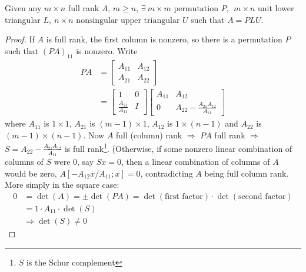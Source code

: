 \documentclass[11pt]{article}
\numberwithin{equation}{section}
\begin{document}
\begin{savenotes}
    \begin{theorem}[LU Decomposition]
        Given any $m \times n$ full rank $A$, $m \geq n$, $\exists \ m \times m \text{ permutation } P, \ \ m \times n $ unit lower triangular $L, \ n \times n \text{ nonsingular upper triangular }U$
        such that $A=PL U$.
        \begin{proof}
            If $A$ is full rank, the first column is nonzero, so there is a permutation $P$ such that $(PA)_{11}$ is nonzero. Write \begin{align*}
                PA &= \left[\begin{array}{ll}
                    A_{11} & A_{12} \\
                    A_{21} & A_{22}
                    \end{array}\right] \\
                &= \left[\begin{array}{ll}
                    1 & 0 \\
                    \frac{A_{21}}{A_{11}} & I
                    \end{array}\right] \left[\begin{array}{ll}
                        A_{11} & A_{12} \\
                        0 & A_{22} - \frac{A_{21} A_{12}}{A_{11}}
                        \end{array}\right]
            \end{align*}
            where $A_{11}$ is $1 \times 1$, $A_{21}$ is $(m-1) \times 1$, $A_{12}$ is $1 \times (n-1)$ and $A_{22}$ is $(m-1) \times (n-1)$.
            Now $A$ full (column) rank $\Longrightarrow$ $PA$ full rank $\Longrightarrow$ $S = A_{22} - \frac{A_{21} A_{12}}{A_{11}}$ is full rank\footnote{$S$ is the Schur complement}. 
            (Otherwise, if some nonzero linear combination of columns of $S$ were 0, say $Sx=0$, then a linear combination of columns of $A$ would be zero, 
            $A\left[ -A_{12} x/A_{11} ; x \right] = 0$, contradicting $A$ being full column rank. More simply in the square case: \begin{align*}
                0 &= \operatorname{det}(A) = \pm \operatorname{det}(PA) = \operatorname{det}(\text{first factor}) \cdot \operatorname{det}(\text{second factor}) \\
                &= 1 \cdot A_{11} \cdot \operatorname{det}(S) \\
                &\Longrightarrow \operatorname{det}(S) \neq 0

\end{align*}
\end{proof}
\end{theorem}
\end{savenotes}
\end{document}

